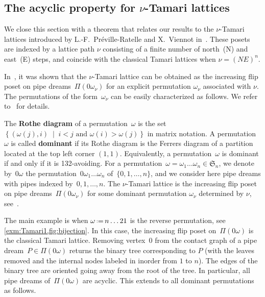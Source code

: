 \documentclass[reqno]{amsart}
\theoremstyle{definition}
\newcommand{\set}[2]{\left\{ #1 \;\middle|\; #2 \right\}} %
\newcommand{\eqdef}{\mbox{\,\raisebox{0.2ex}{\scriptsize\ensuremath{\mathrm:}}\ensuremath{=}\,}} %
\newcommand{\defn}[1]{\textbf{\textsf{\color{PineGreen} #1}}} %
\newcommand{\fS}{\mathfrak{S}} %
\newcommand{\pipeDreams}{\Pi} %
\begin{document}
\subsection{The acyclic property for $\nu$-Tamari lattices} 
\label{subsec:nuTamari} 

We close this section with a theorem that relates our results to the $\nu$-Tamari lattices introduced by L.-F.~Pr\'eville-Ratelle and X.~Viennot in~\cite{PrevilleRatelleViennot}. These posets are indexed by a lattice path $\nu$ consisting of a finite number of north~(N) and east~(E) steps, and coincide with the classical Tamari lattices when $\nu=(NE)^n$.

In~\cite{CeballosPadrolSarmiento}, it was shown that the $\nu$-Tamari lattice can be obtained as the increasing flip poset on pipe dreams~$\pipeDreams(0\omega_\nu)$ for an explicit permutation $\omega_\nu$ associated with $\nu$. The permutations of the form~$\omega_\nu$ can be easily characterized as follows. We refer to~\cite{CeballosPadrolSarmiento} for details.

The \defn{Rothe diagram} of a permutation~$\omega$ is the set $\set{(\omega(j),i)}{i<j \text{ and } \omega(i)>\omega(j)}$ in matrix notation.
A permutation $\omega$ is called \defn{dominant} if its Rothe diagram is the Ferrers diagram of a partition located at the top left corner $(1,1)$. Equivalently, a permutation~$\omega$ is dominant if and only if it is 132-avoiding.
For a permutation~$\omega = \omega_1 \dots \omega_n \in \fS_n$, we denote by~$0\omega$ the permutation~$0 \omega_1 \dots \omega_n$ of~$\{0, 1, \dots, n\}$, and we consider here pipe dreams with pipes indexed by~${0, 1, \dots, n}$.
The $\nu$-Tamari lattice is the increasing flip poset on pipe dreams~$\pipeDreams(0\omega_\nu)$ for some dominant permutation $\omega_\nu$ determined by $\nu$, see~\cite{CeballosPadrolSarmiento}.

The main example is when $\omega \eqdef n \dots 2 1$ is the reverse permutation, see \cref{exm:Tamari1,fig:bijection}.
In this case, the increasing flip poset on~$\pipeDreams(0 \omega)$ is the classical Tamari lattice.
Removing vertex~$0$ from the contact graph of a pipe dream~$ P\in \pipeDreams(0 \omega)$ returns the binary tree corresponding to $P$ (with the leaves removed and the internal nodes labeled in inorder from $1$ to $n$).
The edges of the binary tree are oriented going away from the root of the tree.
In particular, all pipe dreams of~$\pipeDreams(0 \omega)$ are acyclic.
This extends to all dominant permutations as follows.
\end{document}
